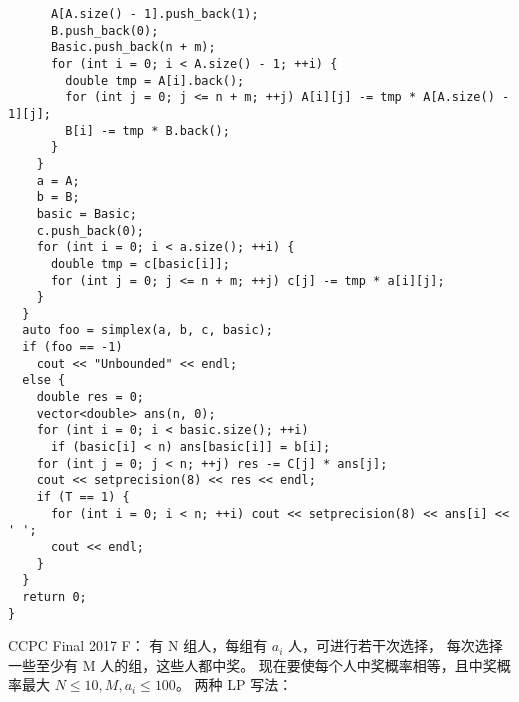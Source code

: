 \begin{lstlisting}
      A[A.size() - 1].push_back(1);
      B.push_back(0);
      Basic.push_back(n + m);
      for (int i = 0; i < A.size() - 1; ++i) {
        double tmp = A[i].back();
        for (int j = 0; j <= n + m; ++j) A[i][j] -= tmp * A[A.size() - 1][j];
        B[i] -= tmp * B.back();
      }
    }
    a = A;
    b = B;
    basic = Basic;
    c.push_back(0);
    for (int i = 0; i < a.size(); ++i) {
      double tmp = c[basic[i]];
      for (int j = 0; j <= n + m; ++j) c[j] -= tmp * a[i][j];
    }
  }
  auto foo = simplex(a, b, c, basic);
  if (foo == -1)
    cout << "Unbounded" << endl;
  else {
    double res = 0;
    vector<double> ans(n, 0);
    for (int i = 0; i < basic.size(); ++i)
      if (basic[i] < n) ans[basic[i]] = b[i];
    for (int j = 0; j < n; ++j) res -= C[j] * ans[j];
    cout << setprecision(8) << res << endl;
    if (T == 1) {
      for (int i = 0; i < n; ++i) cout << setprecision(8) << ans[i] << ' ';
      cout << endl;
    }
  }
  return 0;
}
\end{lstlisting}

CCPC Final 2017 F：
有 N 组人，每组有 $a_{i}$ 人，可进行若干次选择，
每次选择一些至少有 M 人的组，这些人都中奖。
现在要使每个人中奖概率相等，且中奖概率最大
$N \le 10, M, a_{i} \le 100$。
两种 LP 写法：

